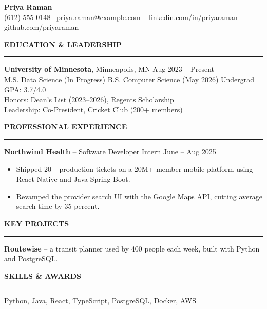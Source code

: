 \documentclass[letterpaper,11pt]{article}
\newcommand{\heading}[1]{\vspace{6pt}\textbf{\large #1}\vspace{2pt}\hrule\vspace{4pt}}
\begin{document}
\begin{center}
  {\LARGE \textbf{Priya Raman}}\\[2pt]
  (612) 555-0148 \quad--\quad priya.raman@example.com \quad--\quad
  linkedin.com/in/priyaraman \quad--\quad github.com/priyaraman
\end{center}

\heading{EDUCATION \& LEADERSHIP}
\textbf{University of Minnesota}, Minneapolis, MN \hfill Aug 2023 -- Present\\
M.S. Data Science (In Progress) \quad B.S. Computer Science (May 2026)
\quad Undergrad GPA: 3.7/4.0\\
Honors: Dean's List (2023--2026), Regents Scholarship\\
Leadership: Co-President, Cricket Club (200+ members)

\heading{PROFESSIONAL EXPERIENCE}
\textbf{Northwind Health} -- Software Developer Intern \hfill June -- Aug 2025
\begin{itemize}
  \item Shipped 20+ production tickets on a 20M+ member mobile platform using React Native and Java Spring Boot.
  \item Revamped the provider search UI with the Google Maps API, cutting average search time by 35 percent.
\end{itemize}

\heading{KEY PROJECTS}
\textbf{Routewise} -- a transit planner used by 400 people each week, built with Python and PostgreSQL.

\heading{SKILLS \& AWARDS}
Python, Java, React, TypeScript, PostgreSQL, Docker, AWS
\end{document}
